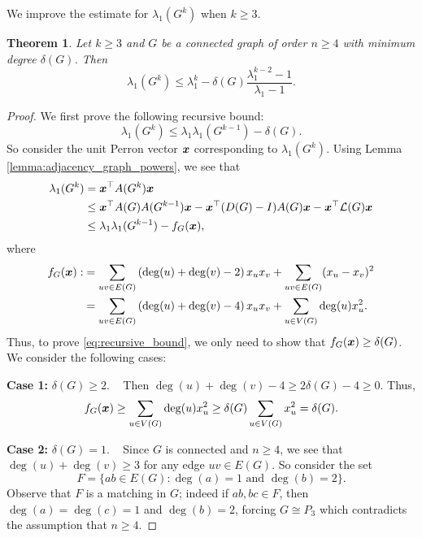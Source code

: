 \documentclass[10pt,a4paper]{article}
\theoremstyle{plain}
\newtheorem{theorem}{Theorem}[section]
\numberwithin{equation}{section}
\def\x{\mbox{\boldmath $x$}}
\begin{document}
We improve the estimate for $\lambda_1(G^k)$ when $k\ge 3$.

\begin{theorem}\label{thm:spectral_radius_higher_power}
Let $k\ge 3$ and $G$ be a connected graph of order $n\ge 4$ with minimum degree $\delta(G)$. Then 
\[\lambda_1(G^k) \le \lambda_1^k - \delta(G)\frac{\lambda_1^{k-2}-1}{\lambda_1 -1}.\]
\end{theorem} 

\begin{proof} 
    We first prove the following recursive bound:
    \begin{equation}\label{eq:recursive_bound}
        \lambda_1(G^k)\le \lambda_1 \lambda_1(G^{k-1}) - \delta(G).
    \end{equation}
    So consider the unit Perron vector $\x$ corresponding to $\lambda_1(G^k)$. Using Lemma \ref{lemma:adjacency_graph_powers}, we see that 
    \begin{align*}
        \lambda_1(G^k) 
        & = \x^\top A(G^k) \x \\
        & \le \x^\top A(G)A(G^{k-1})\x - \x^\top (D(G)-I)A(G)\x - \x^\top \mathcal{L}(G)\x\\
        & \le \lambda_1\lambda_1(G^{k-1}) - f_G(\x), 
    \end{align*}
    where 
    \begin{align*}
      f_G(\x):& = \sum_{uv\in E(G)} \left(\deg(u)+\deg(v)-2\right)x_ux_v + \sum_{uv\in E(G)} (x_u-x_v)^2 \\
      & = \sum_{uv\in E(G)} \left(\deg(u)+\deg(v)-4\right)x_ux_v + \sum_{u\in V(G)} \deg(u)x_u^2.
    \end{align*}
    Thus, to prove \eqref{eq:recursive_bound}, we only need to show that $f_G(\x)\ge \delta(G)$. We consider the following cases:

    \textbf{Case 1:} $\delta(G)\ge 2$. ~ Then $\deg(u)+\deg(v)-4\ge 2\delta(G)-4\ge 0$. Thus, 
    \[ f_G(\x) \ge \sum_{u\in V(G)} \deg(u)x_u^2 \ge \delta(G)\sum_{u\in V(G)}x_u^2  = \delta(G). \]

   \textbf{Case 2:} $\delta(G) = 1$. ~ Since $G$ is connected and $n\ge 4$, we see that $\deg(u) + \deg(v)\ge 3$ for any edge $uv\in E(G)$. So consider the set 
   \[F = \{ab\in E(G): \deg(a)=1 \text{ and }\deg(b) =2\}.\]
   Observe that $F$ is a matching in $G$; indeed if $ab, bc\in F$, then $\deg(a) = \deg(c) = 1$ and $\deg(b)=2$, forcing $G\cong P_3$ which contradicts the assumption that $n\ge 4$.  
   

\end{proof}
\end{document}
